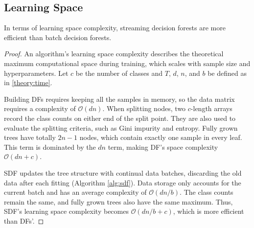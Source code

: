 \subsection{Learning Space}
\begin{lemma}
In terms of learning space complexity, streaming decision forests are more efficient than batch decision forests.
\end{lemma}

\begin{proof}
An algorithm's learning space complexity describes the theoretical maximum computational space during training, which scales with sample size and hyperparameters. Let $c$ be the number of classes and $T$, $d$, $n$, and $b$ be defined as in \ref{theory:time}. 

Building DFs requires keeping all the samples in memory, so the data matrix requires a complexity of $\mathcal{O}(dn)$. When splitting nodes, two $c$-length arrays record the class counts on either end of the split point. They are also used to evaluate the splitting criteria, such as Gini impurity and entropy. Fully grown trees have totally $2n - 1$ nodes, which contain exactly one sample in every leaf. This term is dominated by the $dn$ term, making DF's space complexity $\mathcal{O}(dn + c)$.

SDF updates the tree structure with continual data batches, discarding the old data after each fitting (Algorithm \ref{alg:sdf}). Data storage only accounts for the current batch and has an average complexity of $\mathcal{O}(dn/b)$. The class counts remain the same, and fully grown trees also have the same maximum. Thus, SDF's learning space complexity becomes $\mathcal{O}(dn/b + c)$, which is more efficient than DFs'.
\end{proof}



